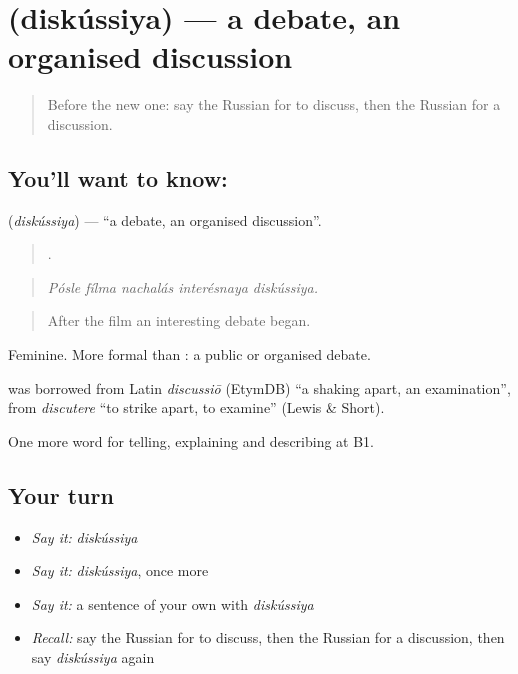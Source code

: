 \section[\texorpdfstring{\ru{дискуссия} (diskússiya)}{дискуссия (diskússiya)}]{ (diskússiya) — a debate, an organised discussion}

\label{lesson:RU-C342-diskussiya}



\begin{quote}
Before the new one: say the Russian for to discuss, then the Russian for a discussion.
\end{quote}

\subsection*{You'll want to know: }
\textbf{} (\emph{diskússiya}) — \textquotedblleft{}a debate, an organised discussion\textquotedblright{}.

\begin{quote}
    .
\end{quote}

\begin{quote}
\emph{Pósle fílma nachalás interésnaya diskússiya.}
\end{quote}

\begin{quote}
After the film an interesting debate began.
\end{quote}

Feminine. More formal than \emph{}: a public or organised debate.

\begin{cousinweb}
\textbf{} was borrowed from Latin \emph{discussiō} (EtymDB) \textquotedblleft{}a shaking apart, an examination\textquotedblright{}, from \emph{discutere} \textquotedblleft{}to strike apart, to examine\textquotedblright{} (Lewis \& Short).
\end{cousinweb}

\begin{grammarlens}[title={What you've built}]
One more word for telling, explaining and describing at B1.
\end{grammarlens}

\subsection*{Your turn}
\begin{itemize}
\raggedright
  \item \emph{Say it:} \emph{diskússiya}
  \item \emph{Say it:} \emph{diskússiya}, once more
  \item \emph{Say it:} a sentence of your own with \emph{diskússiya}
  \item \emph{Recall:} say the Russian for to discuss, then the Russian for a discussion, then say \emph{diskússiya} again
\end{itemize}

